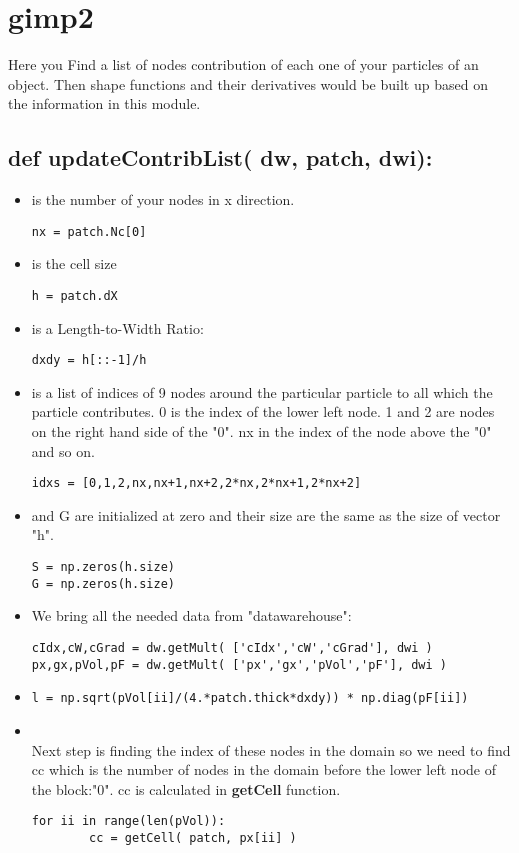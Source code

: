 \documentclass[11pt,fleqn]{book} %
\begin{document}
\section{gimp2}
Here you Find a list of nodes contribution of each one of your particles of an object. Then shape functions and their derivatives would be built up based on the information in this module.
\subsection{def updateContribList( dw, patch, dwi):}
\begin{itemize}
\item {} is the number of your nodes in x direction.
\begin{lstlisting}
nx = patch.Nc[0]
\end{lstlisting}
\item {} is the cell size
\begin{lstlisting}
h = patch.dX
\end{lstlisting}
\item {} is a Length-to-Width Ratio:
\begin{lstlisting}
dxdy = h[::-1]/h
\end{lstlisting}
\item {} is a list of indices of 9 nodes around the particular particle to all which the particle contributes. 0 is the index of the lower left node. 1 and 2 are nodes on the right hand side of the "0". nx in the index of the node above the "0" and so on.
\begin{lstlisting}
idxs = [0,1,2,nx,nx+1,nx+2,2*nx,2*nx+1,2*nx+2]
\end{lstlisting}
\item {} and G are initialized at zero and their size are the same as the size of vector "h".
\begin{lstlisting}
S = np.zeros(h.size)
G = np.zeros(h.size)
\end{lstlisting}
\item We bring all the needed data from "datawarehouse":
\begin{lstlisting}
cIdx,cW,cGrad = dw.getMult( ['cIdx','cW','cGrad'], dwi )
px,gx,pVol,pF = dw.getMult( ['px','gx','pVol','pF'], dwi )
\end{lstlisting}
\item {}
\begin{lstlisting}
l = np.sqrt(pVol[ii]/(4.*patch.thick*dxdy)) * np.diag(pF[ii])
\end{lstlisting}
\item {} \\
Next step is finding the index of these nodes in the domain so we need to find cc which is the number of nodes in the domain before the lower left node of the block:"0". cc is calculated in \textbf{getCell} function.
\begin{lstlisting}
for ii in range(len(pVol)):
        cc = getCell( patch, px[ii] )	  
\end{lstlisting}
\end{itemize}
\end{document}

